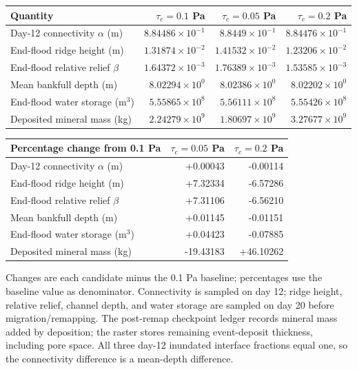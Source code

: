 \begin{center}\small\setlength{\tabcolsep}{4pt}
\begin{tabular}{lrrr}
\toprule
Quantity & $\tau_c=0.1$ Pa & $\tau_c=0.05$ Pa & $\tau_c=0.2$ Pa \\
\midrule
Day-12 connectivity $\alpha$ (m) & $8.84486\times10^{-1}$ & $8.8449\times10^{-1}$ & $8.84476\times10^{-1}$ \\
End-flood ridge height (m) & $1.31874\times10^{-2}$ & $1.41532\times10^{-2}$ & $1.23206\times10^{-2}$ \\
End-flood relative relief $\beta$ & $1.64372\times10^{-3}$ & $1.76389\times10^{-3}$ & $1.53585\times10^{-3}$ \\
Mean bankfull depth (m) & $8.02294\times10^{0}$ & $8.02386\times10^{0}$ & $8.02202\times10^{0}$ \\
End-flood water storage (m$^3$) & $5.55865\times10^{8}$ & $5.56111\times10^{8}$ & $5.55426\times10^{8}$ \\
Deposited mineral mass (kg) & $2.24279\times10^{9}$ & $1.80697\times10^{9}$ & $3.27677\times10^{9}$ \\
\bottomrule\end{tabular}\end{center}
\begin{center}\small
\begin{tabular}{lrr}
\toprule
Percentage change from 0.1 Pa & $\tau_c=0.05$ Pa & $\tau_c=0.2$ Pa \\
\midrule
Day-12 connectivity $\alpha$ (m) & +0.00043 & -0.00114 \\
End-flood ridge height (m) & +7.32334 & -6.57286 \\
End-flood relative relief $\beta$ & +7.31106 & -6.56210 \\
Mean bankfull depth (m) & +0.01145 & -0.01151 \\
End-flood water storage (m$^3$) & +0.04423 & -0.07885 \\
Deposited mineral mass (kg) & -19.43183 & +46.10262 \\
\bottomrule\end{tabular}\end{center}
Changes are each candidate minus the 0.1 Pa baseline; percentages
use the baseline value as denominator. Connectivity
is sampled on day 12; ridge height, relative relief, channel depth,
and water storage are sampled on day 20 before migration/remapping.
The post-remap checkpoint ledger records mineral mass added by
deposition; the raster stores remaining event-deposit thickness,
including pore space. All three day-12 inundated interface fractions
equal one, so the connectivity difference is a mean-depth difference.

